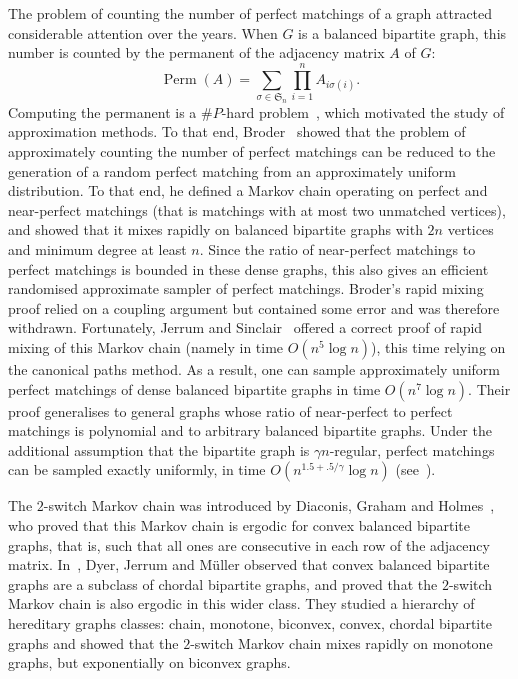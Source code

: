 \documentclass[11pt,a4paper]{article}
\theoremstyle{definition}
\DeclareMathOperator{\perm}{Perm}
\begin{document}
The problem of counting the number of perfect matchings of a graph attracted
considerable attention over the years. When $G$ is a balanced bipartite graph,
this number is counted by the permanent of the adjacency matrix $A$ of $G$:
$$\perm(A) = \sum_{\sigma \in \mathfrak{S}_n} \prod_{i=1}^nA_{i\sigma(i)}.$$
Computing the permanent is a $\#P$-hard problem~\cite{valiant1979Complexity},
which motivated the study of approximation methods. To that end,
Broder~\cite{broder1986Hard} showed that the problem of approximately counting
the number of perfect matchings can be reduced to the generation of a random
perfect matching from an approximately uniform distribution. To that end, he
defined a Markov chain operating on perfect and near-perfect matchings (that is
matchings with at most two unmatched vertices), and showed that it mixes rapidly
on balanced bipartite graphs with $2n$ vertices and minimum degree at least $n$. Since the ratio
of near-perfect matchings to perfect matchings is bounded in these dense graphs,
this also gives an efficient randomised approximate sampler of perfect
matchings. Broder's rapid mixing proof relied on a coupling argument but
contained some error and was therefore withdrawn. Fortunately, Jerrum and
Sinclair~\cite{jerrum1989Approximating} offered a correct proof of rapid mixing of
this Markov chain (namely in time $O(n^5\log n)$), this time relying on the
canonical paths method. As a result, one can sample approximately uniform perfect matchings of dense balanced bipartite graphs in time $O(n^7\log n)$. Their proof generalises to general graphs whose ratio of
near-perfect to perfect matchings is polynomial and to arbitrary balanced
bipartite graphs. Under the additional assumption that the bipartite graph is
$\gamma n$-regular, perfect matchings can be sampled exactly uniformly, in time
$O(n^{1.5+.5/\gamma}\log n)$ (see~\cite{huber2006Exact}).

The $2$-switch Markov chain was introduced by Diaconis, Graham and
Holmes~\cite{diaconis2001Statistical}, who proved that this Markov chain is
ergodic for convex balanced bipartite graphs, that is, such that all ones are
consecutive in each row of the adjacency matrix. In~\cite{dyer2017Switch}, Dyer,
Jerrum and Müller observed that convex balanced bipartite graphs are a subclass
of chordal bipartite graphs, and proved that the $2$-switch Markov chain is also
ergodic in this wider class. They studied a hierarchy of hereditary graphs
classes: chain, monotone, biconvex, convex, chordal bipartite graphs and showed
that the $2$-switch Markov chain mixes rapidly on monotone graphs, but
exponentially on biconvex graphs.
\end{document}
